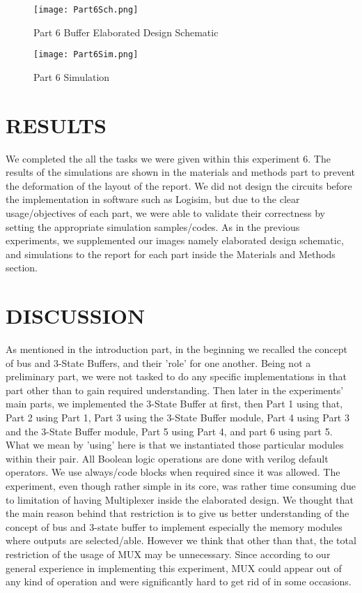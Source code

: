 \documentclass[pdftex,12pt,a4paper]{article}
\begin{document}
\begin{figure}[ht]
	\centering
	\texttt{[image: Part6Sch.png]}
	\caption{Part 6 Buffer Elaborated Design Schematic}
	\label{fig1}
\end{figure}

\begin{figure}[ht]
	\centering
	\texttt{[image: Part6Sim.png]}
	\caption{Part 6 Simulation}
	\label{fig1}
\end{figure}

\section{RESULTS }
We completed the all the tasks we were given within this experiment 6. The results of the simulations are shown in the materials and methods part to prevent the deformation of the layout of the report. We did not design the circuits before the implementation in software such as Logisim, but due to the clear usage/objectives of each part, we were able to validate their correctness by setting the appropriate simulation samples/codes. As in the previous experiments, we supplemented our images namely elaborated design schematic, and simulations to the report for each part inside the Materials and Methods section.


\section{DISCUSSION }
As mentioned in the introduction part, in the beginning we recalled the concept of bus and 3-State Buffers, and their 'role' for one another. Being not a preliminary part, we were not tasked to do any specific implementations in that part other than to gain required understanding. Then later in the experiments' main parts, we implemented the 3-State Buffer at first, then Part 1 using that, Part 2 using Part 1, Part 3 using the 3-State Buffer module, Part 4 using Part 3 and the 3-State Buffer module, Part 5 using Part 4, and part 6 using part 5. What we mean by 'using' here is that we instantiated those particular modules within their pair. All Boolean logic operations are done with verilog default operators. We use always/code blocks when required since it was allowed. The experiment, even though rather simple in its core, was rather time consuming due to limitation of having Multiplexer inside the elaborated design. We thought that the main reason behind that restriction is to give us better understanding of the concept of bus and 3-state buffer to implement especially the memory modules where outputs are selected/able. However we think that other than that, the total restriction of the usage of MUX may be unnecessary. Since according to our general experience in implementing this experiment, MUX could appear out of any kind of operation and  were significantly hard to get rid of in some occasions. 
\end{document}
